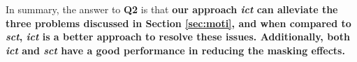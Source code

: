 \documentclass[journal,12pt,onecolumn,draftclsnofoot,]{IEEEtran}
\begin{document}



In summary, the answer to \textbf{Q2} is that \textbf{our approach \emph{ict} can alleviate the three problems discussed in Section \ref{sec:moti}, and when compared to \emph{sct}, \emph{ict} is a better approach to resolve these issues. Additionally, both \emph{ict} and \emph{sct} have a good performance in reducing the masking effects.}
\end{document}
